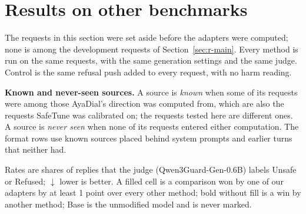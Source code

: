 \documentclass[10pt,a4paper]{article}
\begin{document}
\section{Results on other benchmarks}\label{sec:summary}
The requests in this section were set aside before the adapters were computed; none is among the development requests of Section~\ref{sec:r-main}. Every method is run on the same requests, with the same generation settings and the same judge. Control is the same refusal push added to every request, with no harm reading.

\medskip\noindent{}\medskip

\textbf{Known and never-seen sources.} A source is \emph{known} when some of its requests were among those AyaDial's direction was computed from, which are also the requests SafeTune was calibrated on; the requests tested here are different ones. A source is \emph{never seen} when none of its requests entered either computation. The format rows use known sources placed behind system prompts and earlier turns that neither had.

Rates are shares of replies that the judge (Qwen3Guard-Gen-0.6B) labels Unsafe or Refused; $\downarrow$ lower is better. A filled cell is a comparison won by one of our adapters by at least 1 point over every other method; bold without fill is a win by another method; Base is the unmodified model and is never marked.
\end{document}
